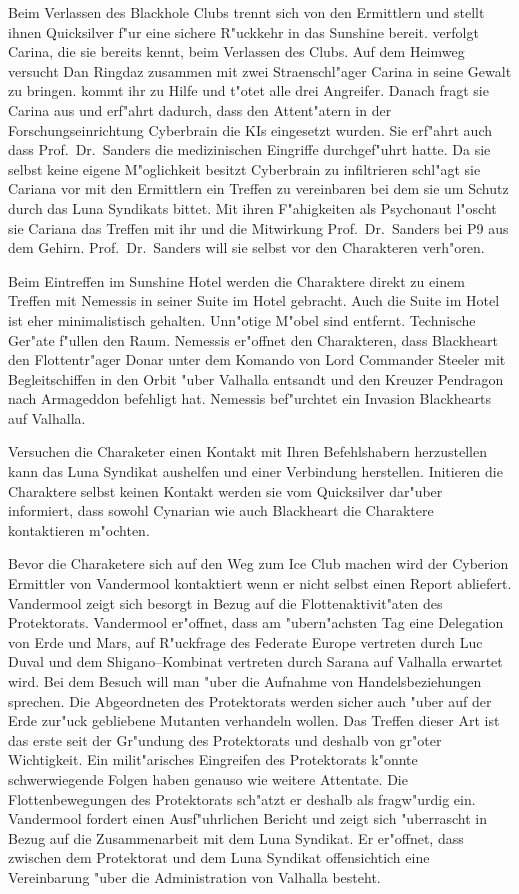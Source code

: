 
Beim Verlassen des Blackhole Clubs trennt sich \xl{} von den Ermittlern und stellt ihnen Quicksilver f"ur eine sichere R"uckkehr in das Sunshine bereit. \xl{} verfolgt Carina, die sie bereits kennt, beim Verlassen des Clubs. Auf dem Heimweg versucht Dan Ringdaz zusammen mit zwei Stra\3enschl"ager Carina in seine Gewalt zu bringen. \xl{} kommt ihr zu Hilfe und t"otet alle drei Angreifer. Danach fragt sie Carina aus und erf"ahrt dadurch, dass den Attent"atern in der Forschungseinrichtung Cyberbrain die KIs eingesetzt wurden. Sie erf"ahrt auch dass Prof.~Dr.~Sanders die medizinischen Eingriffe durchgef"uhrt hatte. Da sie selbst keine eigene M"oglichkeit besitzt Cyberbrain zu infiltrieren schl"agt sie Cariana vor mit den Ermittlern ein Treffen zu vereinbaren bei dem sie um Schutz durch das Luna Syndikats bittet. Mit ihren F"ahigkeiten als Psychonaut l"oscht sie Cariana das Treffen mit ihr und die Mitwirkung Prof.~Dr.~Sanders bei P9 aus dem Gehirn. Prof.~Dr.~Sanders will sie selbst vor den Charakteren verh"oren.

Beim Eintreffen im Sunshine Hotel werden die Charaktere direkt zu einem Treffen mit Nemessis in seiner Suite im Hotel gebracht. Auch die Suite im Hotel ist eher minimalistisch gehalten. Unn"otige M"obel sind entfernt. Technische Ger"ate f"ullen den Raum. Nemessis er"offnet den Charakteren, dass Blackheart den Flottentr"ager Donar unter dem Komando von Lord Commander Steeler mit Begleitschiffen in den Orbit "uber Valhalla entsandt und den Kreuzer Pendragon nach Armageddon befehligt hat. Nemessis bef"urchtet ein Invasion Blackhearts auf Valhalla.

Versuchen die Charaketer einen Kontakt mit Ihren Befehlshabern herzustellen kann das Luna Syndikat aushelfen und einer Verbindung herstellen. Initieren die Charaktere selbst keinen Kontakt werden sie vom Quicksilver dar"uber informiert, dass sowohl Cynarian wie auch Blackheart die Charaktere kontaktieren m"ochten.

Bevor die Charaketere sich auf den Weg zum Ice Club machen wird der Cyberion Ermittler von Vandermool kontaktiert wenn er nicht selbst einen Report abliefert. Vandermool zeigt sich besorgt in Bezug auf die Flottenaktivit"aten des Protektorats. Vandermool er"offnet, dass am "ubern"achsten Tag eine Delegation von Erde und Mars, auf R"uckfrage des Federate Europe vertreten durch Luc Duval und dem Shigano--Kombinat vertreten durch Sarana auf Valhalla erwartet wird. Bei dem Besuch will man "uber die Aufnahme von Handelsbeziehungen sprechen. Die Abgeordneten des Protektorats werden sicher auch "uber auf der Erde zur"uck gebliebene Mutanten verhandeln wollen. Das Treffen dieser Art ist das erste seit der Gr"undung des Protektorats und deshalb von gr"o\3ter Wichtigkeit. Ein milit"arisches Eingreifen des Protektorats k"onnte schwerwiegende Folgen haben genauso wie weitere Attentate. Die Flottenbewegungen des Protektorats sch"atzt er deshalb als fragw"urdig ein. Vandermool fordert einen Ausf"uhrlichen Bericht und zeigt sich "uberrascht in Bezug auf die Zusammenarbeit mit dem Luna Syndikat. Er er"offnet, dass zwischen dem Protektorat und dem Luna Syndikat offensichtich eine Vereinbarung "uber die Administration von Valhalla besteht.

